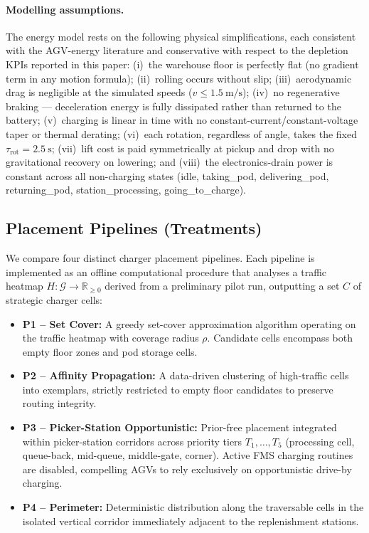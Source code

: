 \documentclass[conference]{IEEEtran}
\begin{document}
\paragraph{Modelling assumptions.}
The energy model rests on the following physical simplifications, each consistent with the AGV-energy literature and conservative with respect to the depletion KPIs reported in this paper: (i)~the warehouse floor is perfectly flat (no gradient term in any motion formula); (ii)~rolling occurs without slip; (iii)~aerodynamic drag is negligible at the simulated speeds ($v \leq \SI{1.5}{\meter\per\second}$); (iv)~no regenerative braking --- deceleration energy is fully dissipated rather than returned to the battery; (v)~charging is linear in time with no constant-current/constant-voltage taper or thermal derating; (vi)~each rotation, regardless of angle, takes the fixed $\tau_\text{rot} = \SI{2.5}{\second}$; (vii)~lift cost is paid symmetrically at pickup and drop with no gravitational recovery on lowering; and (viii)~the electronics-drain power is constant across all non-charging states (idle, taking\_pod, delivering\_pod, returning\_pod, station\_processing, going\_to\_charge).

\subsection{Placement Pipelines (Treatments)}
We compare four distinct charger placement pipelines. Each pipeline is implemented as an offline computational procedure that analyses a traffic heatmap $H:\mathcal{G}\to\mathbb{R}_{\geq 0}$ derived from a preliminary pilot run, outputting a set $C$ of strategic charger cells:

\begin{itemize}
  \item \textbf{P1 -- Set Cover:} A greedy set-cover approximation algorithm operating on the traffic heatmap with coverage radius $\rho$. Candidate cells encompass both empty floor zones and pod storage cells.
  \item \textbf{P2 -- Affinity Propagation:} A data-driven clustering of high-traffic cells into exemplars, strictly restricted to empty floor candidates to preserve routing integrity.
  \item \textbf{P3 -- Picker-Station Opportunistic:} Prior-free placement integrated within picker-station corridors across priority tiers $T_1, \ldots, T_5$ (processing cell, queue-back, mid-queue, middle-gate, corner). Active FMS charging routines are disabled, compelling AGVs to rely exclusively on opportunistic drive-by charging.
  \item \textbf{P4 -- Perimeter:} Deterministic distribution along the traversable cells in the isolated vertical corridor immediately adjacent to the replenishment stations.
\end{itemize}
\end{document}
